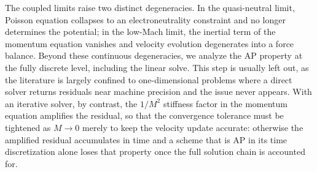 \documentclass[pdflatex,final,10pt]{article}
\begin{document}
The coupled limits raise two distinct degeneracies. In the quasi-neutral limit, Poisson equation collapses to an electroneutrality constraint and no longer determines the potential; in the low-Mach limit, the inertial term of the momentum equation vanishes and velocity evolution degenerates into a force balance. Beyond these continuous degeneracies, we analyze the AP property at the fully discrete level, including the linear solve. This step is usually left out, as the literature is largely confined to one-dimensional problems where a direct solver returns residuals near machine precision and the issue never appears. With an iterative solver, by contrast, the $1/M^2$ stiffness factor in the momentum equation amplifies the residual, so that the convergence tolerance must be tightened as $M \to 0$ merely to keep the velocity update accurate: otherwise the amplified residual accumulates in time and a scheme that is AP in its time discretization alone loses that property once the full solution chain
is accounted for.
\end{document}
